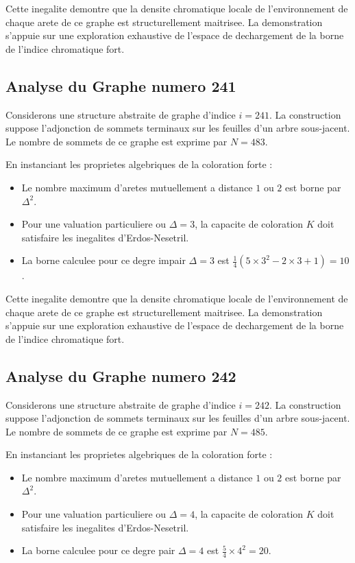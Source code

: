 \documentclass[11pt,a4paper]{article}
\begin{document}
Cette inegalite demontre que la densite chromatique locale de l'environnement de chaque arete de ce graphe est structurellement maitrisee. La demonstration s'appuie sur une exploration exhaustive de l'espace de dechargement de la borne de l'indice chromatique fort.

\subsection{Analyse du Graphe numero 241}
Considerons une structure abstraite de graphe d'indice $i = 241$. La construction suppose l'adjonction de sommets terminaux sur les feuilles d'un arbre sous-jacent. Le nombre de sommets de ce graphe est exprime par $N = 483$.

En instanciant les proprietes algebriques de la coloration forte :
\begin{itemize}
\item Le nombre maximum d'aretes mutuellement a distance $1$ ou $2$ est borne par $\Delta^2$.
\item Pour une valuation particuliere ou $\Delta = 3$, la capacite de coloration $K$ doit satisfaire les inegalites d'Erdos-Nesetril.
\item La borne calculee pour ce degre impair $\Delta = 3$ est $\frac{1}{4}(5 \times 3^2 - 2 \times 3 + 1) = 10$.
\end{itemize}

Cette inegalite demontre que la densite chromatique locale de l'environnement de chaque arete de ce graphe est structurellement maitrisee. La demonstration s'appuie sur une exploration exhaustive de l'espace de dechargement de la borne de l'indice chromatique fort.

\subsection{Analyse du Graphe numero 242}
Considerons une structure abstraite de graphe d'indice $i = 242$. La construction suppose l'adjonction de sommets terminaux sur les feuilles d'un arbre sous-jacent. Le nombre de sommets de ce graphe est exprime par $N = 485$.

En instanciant les proprietes algebriques de la coloration forte :
\begin{itemize}
\item Le nombre maximum d'aretes mutuellement a distance $1$ ou $2$ est borne par $\Delta^2$.
\item Pour une valuation particuliere ou $\Delta = 4$, la capacite de coloration $K$ doit satisfaire les inegalites d'Erdos-Nesetril.
\item La borne calculee pour ce degre pair $\Delta = 4$ est $\frac{5}{4} \times 4^2 = 20$.
\end{itemize}
\end{document}
